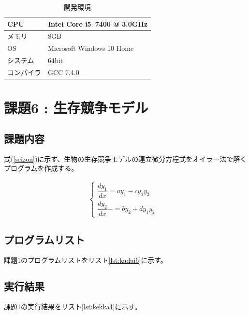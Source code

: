 \begin{table}[H]
  \centering
  \caption{開発環境}
  \label{tb:kan}

  \begin{tabular}{|l|l|}
    \hline
    CPU & Intel Core i5--7400 @ 3.0GHz \\ \hline
    メモリ & 8GB \\ \hline
    OS & Microsoft Windows 10 Home \\ \hline
    システム & 64bit \\ \hline
    コンパイラ & GCC 7.4.0 \\ \hline
  \end{tabular}
\end{table}


\section{課題6 : 生存競争モデル}
\subsection{課題内容}
式(\ref{seizon})に示す、生物の生存競争モデルの連立微分方程式をオイラー法で解くプログラムを作成する。

\begin{eqnarray}
  \begin{cases}
  \dfrac{dy_{1}}{dx} = ay_{1} - cy_{1} y_{2} & \\
  \dfrac{dy_{2}}{dx} -= by_2 + dy_{1} y_{2} &
  \label{seizon}
  \end{cases}
  \label{223759_6Jan19}
\end{eqnarray}

\subsection{プログラムリスト}
課題1のプログラムリストをリスト\ref{lst:kadai6}に示す。



\subsection{実行結果}
課題1の実行結果をリスト\ref{lst:kekka1}に示す。

